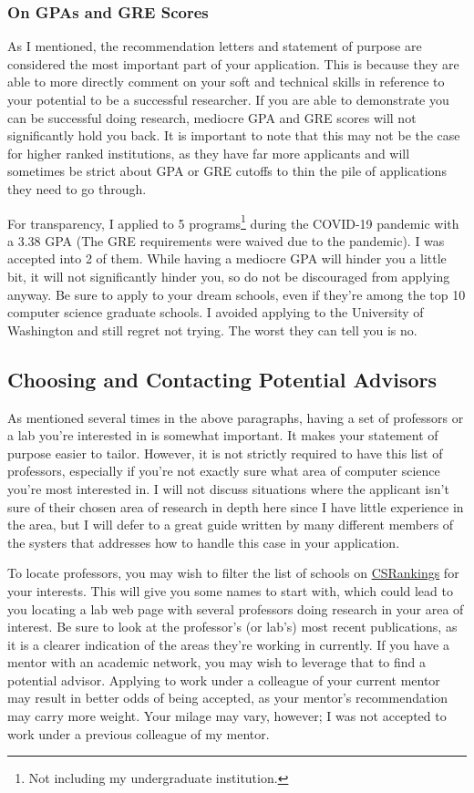 \documentclass[12pt]{article}
\begin{document}
\subsubsection{On GPAs and GRE Scores}

As I mentioned, the recommendation letters and statement of purpose are considered the most important part of your application. This is because they are able to more directly comment on your soft and technical skills in reference to your potential to be a successful researcher. If you are able to demonstrate you can be successful doing research, mediocre GPA and GRE scores will not significantly hold you back. It is important to note that this may not be the case for higher ranked institutions, as they have far more applicants and will sometimes be strict about GPA or GRE cutoffs to thin the pile of applications they need to go through.

For transparency, I applied to 5 programs\footnote{Not including my undergraduate institution.} during the COVID-19 pandemic with a 3.38 GPA (The GRE requirements were waived due to the pandemic). I was accepted into 2 of them. While having a mediocre GPA will hinder you a little bit, it will not significantly hinder you, so do not be discouraged from applying anyway. Be sure to apply to your dream schools, even if they’re among the top 10 computer science graduate schools. I avoided applying to the University of Washington and still regret not trying. The worst they can tell you is no.

\subsection{Choosing and Contacting Potential Advisors}

As mentioned several times in the above paragraphs, having a set of professors or a lab you’re interested in is somewhat important. It makes your statement of purpose easier to tailor. However, it is not strictly required to have this list of professors, especially if you’re not exactly sure what area of computer science you’re most interested in. I will not discuss situations where the applicant isn’t sure of their chosen area of research in depth here since I have little experience in the area, but I will defer to a great guide written by many different members of the systers that addresses how to handle this case in your application. \cite{systerssop}

To locate professors, you may wish to filter the list of schools on \href{https://csrankings.org}{CSRankings} for your interests. This will give you some names to start with, which could lead to you locating a lab web page with several professors doing research in your area of interest. Be sure to look at the professor's (or lab's) most recent publications, as it is a clearer indication of the areas they're working in currently. If you have a mentor with an academic network, you may wish to leverage that to find a potential advisor. Applying to work under a colleague of your current mentor may result in better odds of being accepted, as your mentor's recommendation may carry more weight. Your milage may vary, however; I was not accepted to work under a previous colleague of my mentor.
\end{document}
